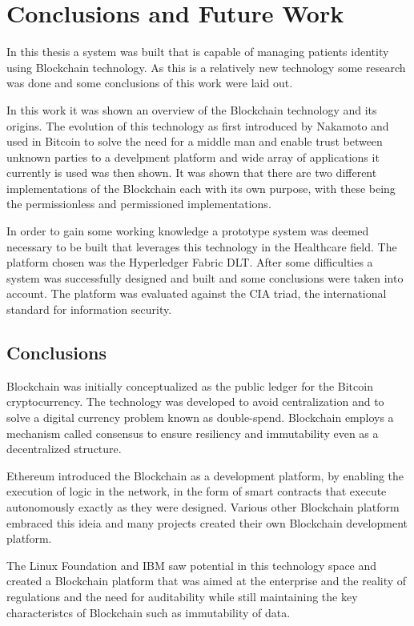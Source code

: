 \chapter{Conclusions and Future Work}
\label{Conclusion}

In this thesis a system was built that is capable of managing patients identity
using Blockchain technology. As this is a relatively new technology some
research was done and some conclusions of this work were laid out. 

In this work it was shown an overview of the Blockchain technology and its
origins. The evolution of this technology as first introduced by Nakamoto and
used in Bitcoin to solve the need for a middle man and enable trust between
unknown parties to a develpment platform and wide array of applications it
currently is used was then shown. It was shown that there are two different
implementations of the Blockchain each with its own purpose, with these being
the permissionless and permissioned implementations.

In order to gain some working knowledge a prototype system was deemed necessary
to be built that leverages this technology in the Healthcare field. The
platform chosen was the Hyperledger Fabric DLT. After some difficulties a
system was successfully designed and built and some conclusions were taken into
account. The platform was evaluated against the CIA triad, the international
standard for information security.

\section{Conclusions}

Blockchain was initially conceptualized as the public ledger for the Bitcoin
cryptocurrency. The technology was developed to avoid centralization and to
solve a digital currency problem known as double-spend. Blockchain employs a
mechanism called consensus to ensure resiliency and immutability even as a
decentralized structure.

Ethereum introduced the Blockchain as a development platform, by enabling the
execution of logic in the network, in the form of smart contracts that execute
autonomously exactly as they were designed. Various other Blockchain platform
embraced this ideia and many projects created their own Blockchain development
platform.

The Linux Foundation and IBM saw potential in this technology space and created
a Blockchain platform that was aimed at the enterprise and the reality of
regulations and the need for auditability while still maintaining the key
characteristcs of Blockchain such as immutability of data.

